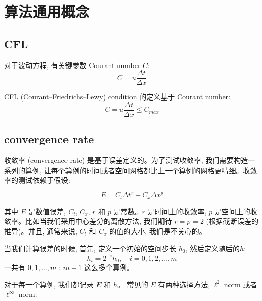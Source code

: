 
\chapter{算法通用概念}

\section{CFL}

对于波动方程, 有关键参数 Courant number $C$:
\begin{equation}
    C = u \frac{\Delta t}{\Delta x}
\end{equation}

CFL (Courant–Friedrichs–Lewy) condition 的定义基于 Courant number:
\begin{equation}
    C = u \frac{\Delta t}{\Delta x} \leq C_{max}
\end{equation}




\section{convergence rate}

收敛率 (convergence rate) 是基于误差定义的。为了测试收敛率, 我们需要构造一系列的算例, 让每个算例的时间或者空间网格都比上一个算例的网格更精细。收敛率的测试依赖于假设:

\begin{equation}
    E = C_t \Delta t^r + C_x \Delta x^p
\end{equation}

其中 $E$ 是数值误差, $C_t$, $C_x$, $r$ 和 $p$ 是常数。$r$ 是时间上的收敛率, $p$ 是空间上的收敛率。比如当我们采用中心差分的离散方法, 我们期待 $r=p=2$ (根据截断误差的推导)。并且, 通常来说, $C_t$ 和 $C_x$ 的值的大小, 我们是不关心的。



当我们计算误差的时候, 首先, 定义一个初始的空间步长 $h_0$, 然后定义随后的$h$:
\begin{equation}
    h_i = 2^{-i} h_0, \quad i=0,1,2,...,m
\end{equation}
一共有 $0,1,...,m$ : $m+1$ 这么多个算例。

对于每一个算例, 我们都记录 $E$ 和 $h$。 常见的 $E$ 有两种选择方法, $\ell^2$ norm 或者 $\ell^\infty$ norm:

